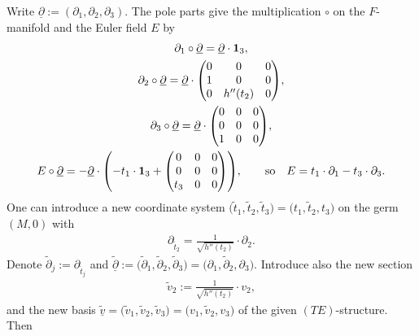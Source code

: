 \documentclass[pdftex]{sigma}%
\numberwithin{equation}{section}
\numberwithin{figure}{section}
\newcommand{\www}{\widetilde}
\newcommand{\uuuu}{\underline}
\newcommand{\paa}{\partial}
\begin{document}
Write $\uuuu\paa:=(\paa_1,\paa_2,\paa_3)$.
The pole parts give the multiplication $\circ$ on the
$F$-manifold and the Euler field $E$ by
\begin{gather*}%
\paa_1\circ\uuuu{\paa}=\uuuu{\paa}\cdot{\bf 1}_3,\\
\paa_2\circ\uuuu{\paa}= \uuuu{\paa}\cdot
\begin{pmatrix}0&0&0\\1&0&0\\0&h''(t_2)&0\end{pmatrix}\!,\nonumber\\
\paa_3\circ\uuuu{\paa}= \uuuu{\paa}\cdot
\begin{pmatrix}0&0&0\\0&0&0\\1&0&0\end{pmatrix}\!,\nonumber\\
E\circ\uuuu{\paa}= -\uuuu{\paa}\cdot
\left(-t_1\cdot {\bf 1}_3
+\begin{pmatrix}0&0&0\\0&0&0\\t_3&0&0\end{pmatrix}\right)\!,\qquad
\text{so}\quad E= t_1\cdot\paa_1-t_3\cdot\paa_3.\nonumber
\end{gather*}
One can introduce a new coordinate system
$\big(\www t_1,\www t_2,\www t_3\big)=\big(t_1,\www t_2,t_3\big)$ on the germ
$(M,0)$ with
\begin{gather*}%
\paa_{\www t_2}=\frac{1}{\sqrt{h''(t_2)}}\cdot\paa_2.
\end{gather*}
Denote $\www\paa_j:=\paa_{\www t_j}$
and $\www{\uuuu\paa}:=\big(\www\paa_1,\www\paa_2,
\www\paa_3\big)=\big(\paa_1,\www\paa_2,\paa_3\big)$.
Introduce also the new section
\begin{gather*}%
\www v_2:=\frac{1}{\sqrt{h''(t_2)}}\cdot v_2,
\end{gather*}
and the new basis
$\www{\uuuu v}=\big(\www v_1,\www v_2,\www v_3\big)
=\big(v_1,\www v_2,v_3\big)$
of the given $(TE)$-structure. Then
\end{document}
